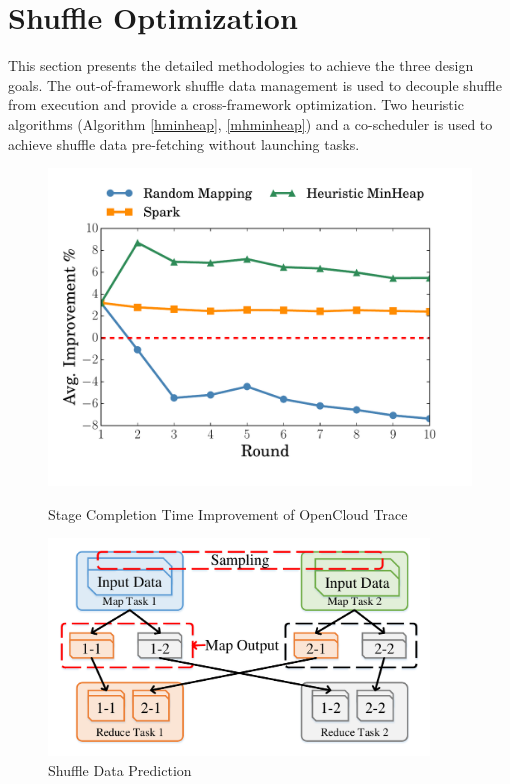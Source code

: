 \section{Shuffle Optimization}
\label{opt}
This section presents the detailed methodologies to achieve the three design goals. 
The out-of-framework shuffle data management is used to decouple shuffle from execution and provide a cross-framework optimization. 
Two heuristic algorithms (Algorithm \ref{hminheap}, \ref{mhminheap}) and a co-scheduler is used to achieve shuffle data pre-fetching without launching tasks.

\begin{figure}
    \centering
    \begin{minipage}{0.42\textwidth}
        \centering
        \includegraphics[width=\textwidth]{fig/sim} %
		\caption{Stage Completion Time Improvement of OpenCloud Trace}
		\label{fig:sim}
	\end{minipage}
	\begin{minipage}{0.49\textwidth}
        \centering
        \includegraphics[width=0.9\textwidth]{fig/shuffle} %
		\caption{Shuffle Data Prediction}
		\label{fig:shuffle}
    \end{minipage}\hfill
\end{figure}

